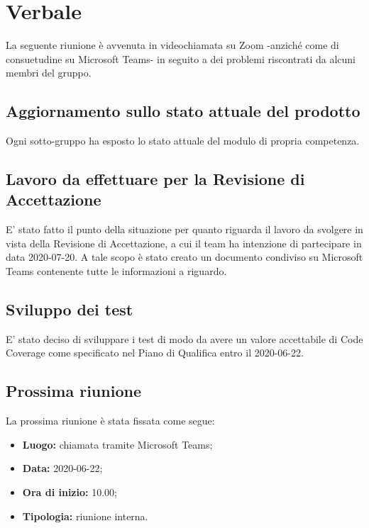 \section{Verbale}
La seguente riunione è avvenuta in videochiamata su Zoom -anziché come di consuetudine su Microsoft Teams- in seguito a dei problemi riscontrati da alcuni membri del gruppo. 

	\subsection{Aggiornamento sullo stato attuale del prodotto}
		Ogni sotto-gruppo ha esposto lo stato attuale del modulo\textit{} di propria competenza.
		
	\subsection{Lavoro da effettuare per la Revisione di Accettazione}
		E' stato fatto il punto della situazione per quanto riguarda il lavoro da svolgere in vista della Revisione di Accettazione, a cui il team ha intenzione di partecipare in data 2020-07-20. A tale scopo è stato creato un documento condiviso su Microsoft Teams contenente tutte le informazioni a riguardo.
		
	\subsection{Sviluppo dei test}
		E' stato deciso di sviluppare i test di modo da avere un valore accettabile di Code Coverage come specificato nel Piano di Qualifica entro il 2020-06-22.
				
	\subsection{Prossima riunione}
		La prossima riunione è stata fissata come segue:
		\begin{itemize}
			\item \textbf{Luogo:} chiamata tramite Microsoft Teams; 
			\item \textbf{Data:} 2020-06-22;
			\item \textbf{Ora di inizio:} 10.00;
			\item \textbf{Tipologia:} riunione interna.
		\end{itemize}